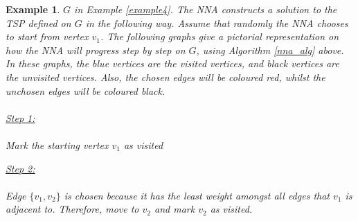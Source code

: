 \documentclass[12pt]{article}
\newtheorem{example}[definition]{Example}
\numberwithin{equation}{subsection}
\numberwithin{table}{subsection}
\numberwithin{algorithm}{subsection}
\numberwithin{figure}{subsection}
\begin{document}
\begin{example}
\label{example_nna_explanation}
 $G$ in Example \ref{example4}. The NNA constructs a solution to the TSP defined on $G$ in the following way. Assume that randomly the NNA chooses to start from vertex $v_1$. The following graphs give a pictorial representation on how the NNA will progress step by step on $G$, using Algorithm \ref{nna_alg} above. In these graphs, the blue vertices are the visited vertices, and black vertices are the unvisited vertices. Also, the chosen edges will be coloured red, whilst the unchosen edges will be coloured black.\\\\
\underline{Step 1:}\\\\
Mark the starting vertex $v_1$ as visited
\begin{center}
\end{center}
\underline{Step 2:}\\\\
Edge $\{v_1, v_2\}$ is chosen because it has the least weight amongst all edges that $v_1$ is adjacent to. Therefore, move to $v_2$ and mark $v_2$ as visited.
\begin{center}
\end{center}
\end{example}
\end{document}
